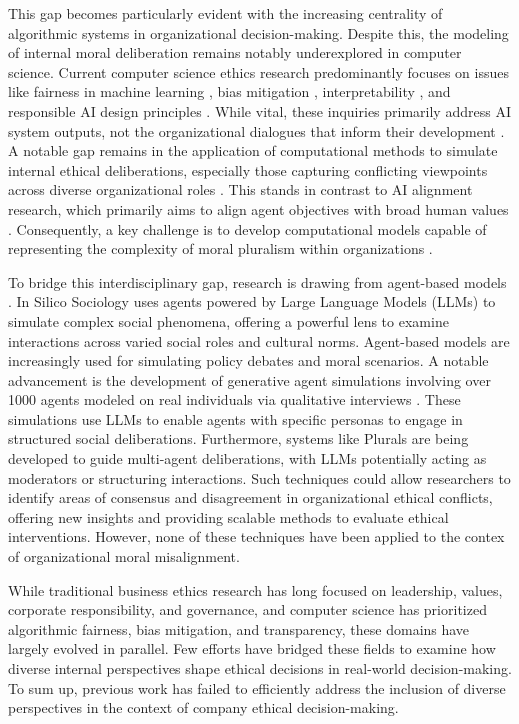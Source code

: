 This gap becomes particularly evident with the increasing centrality of algorithmic systems in organizational decision-making. Despite this, the modeling of internal moral deliberation remains notably underexplored in computer science. Current computer science ethics research predominantly focuses on issues like fairness in machine learning \cite{mehrabi2022survey}, bias mitigation \cite{bianchi2023easily}, interpretability \cite{doshi-velez2017towards}, and responsible AI design principles \cite{leslieunderstanding, sandersonimplementing,sekrstai,sadek2025challenges}. While vital, these inquiries primarily address AI system outputs, not the organizational dialogues that inform their development \cite{madaio_etal_2020}. A notable gap remains in the application of computational methods to simulate internal ethical deliberations, especially those capturing conflicting viewpoints across diverse organizational roles \cite{herdel2024exploregen}. This stands in contrast to AI alignment research, which primarily aims to align agent objectives with broad human values \cite{gabrielartificial}. Consequently, a key challenge is to develop computational models capable of representing the complexity of moral pluralism within organizations \cite{sekrstai}.

To bridge this interdisciplinary gap, research is drawing from agent-based models \cite{gilbert_2022}. In Silico Sociology \cite{kozlowski_etal_2024} uses agents powered by Large Language Models (LLMs) to simulate complex social phenomena, offering a powerful lens to examine interactions across varied social roles and cultural norms. Agent-based models are increasingly used for simulating policy debates and moral scenarios. A notable advancement is the development of generative agent simulations involving over 1000 agents modeled on real individuals via qualitative interviews \cite{park_etal_2024_1000}. These simulations use LLMs to enable agents with specific personas to engage in structured social deliberations. Furthermore, systems like Plurals \cite{ashkinaze_etal_2025} are being developed to guide multi-agent deliberations, with LLMs potentially acting as moderators or structuring interactions. Such techniques could allow researchers to identify areas of consensus and disagreement in organizational ethical conflicts, offering new insights and providing scalable methods to evaluate ethical interventions. However, none of these techniques have been applied to the contex of organizational moral misalignment.

While traditional business ethics research has long focused on leadership, values, corporate responsibility, and governance, and computer science has prioritized algorithmic fairness, bias mitigation, and transparency, these domains have largely evolved in parallel. Few efforts have bridged these fields to examine how diverse internal perspectives shape ethical decisions in real-world decision-making.
To sum up, previous work has failed to efficiently address the inclusion of diverse perspectives in the context of company ethical decision-making.

